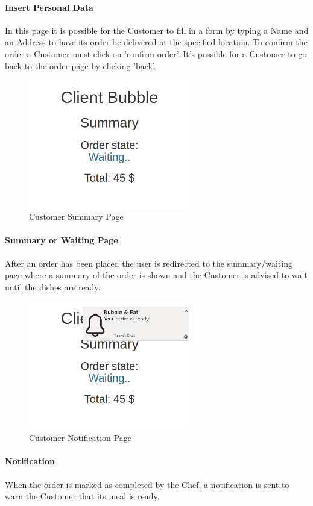 \paragraph{Insert Personal Data}
In this page it is possible for the Customer to fill in a form by typing a Name and an Address to have its order be delivered at the specified location. To confirm the order a Customer must click on 'confirm order'. 
It's possible for a Customer to go back to the order page by clicking 'back'.

\begin{figure}[H]
	\centering
	\includegraphics[width=7cm]{../../documenti/UserManualDemo/demo_screens/client_summary.png}
	\caption{Customer Summary Page}
\end{figure}
\paragraph{Summary or Waiting Page}
After an order has been placed the user is redirected to the summary/waiting page where a summary of the order is shown and the Customer is advised to wait until the dishes are ready.

\begin{figure}[H]
	\centering
	\includegraphics[width=7cm]{../../documenti/UserManualDemo/demo_screens/client_notification.png}
	\caption{Customer Notification Page}
\end{figure}
\paragraph{Notification}
When the order is marked as completed by the Chef, a notification is sent to warn the Customer that its meal is ready.

